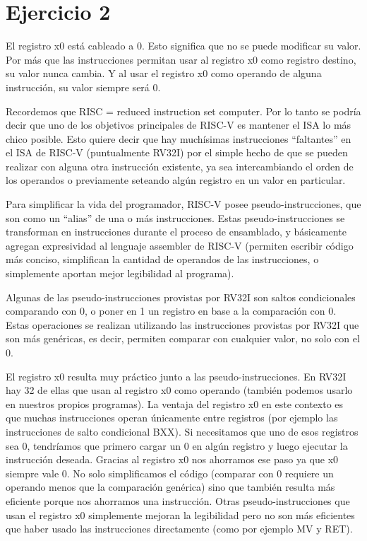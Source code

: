 \section{Ejercicio 2}

El registro x0 está cableado a 0. Esto significa que no se puede modificar su valor. Por más que las instrucciones permitan usar al registro x0 como registro destino, su valor nunca cambia. Y al usar el registro x0 como operando de alguna instrucción, su valor siempre será 0.

Recordemos que RISC = reduced instruction set computer. Por lo tanto se podría decir que uno de los objetivos principales de RISC-V es mantener el ISA lo más chico posible. Esto quiere decir que hay muchísimas instrucciones ``faltantes'' en el ISA de RISC-V (puntualmente RV32I) por el simple hecho de que se pueden realizar con alguna otra instrucción existente, ya sea intercambiando el orden de los operandos o previamente seteando algún registro en un valor en particular.

Para simplificar la vida del programador, RISC-V posee pseudo-instrucciones, que son como un ``alias'' de una o más instrucciones. Estas pseudo-instrucciones se transforman en instrucciones durante el proceso de ensamblado, y básicamente agregan expresividad al lenguaje assembler de RISC-V (permiten escribir código más conciso, simplifican la cantidad de operandos de las instrucciones, o simplemente aportan mejor legibilidad al programa).

Algunas de las pseudo-instrucciones provistas por RV32I son saltos condicionales comparando con 0, o poner en 1 un registro en base a la comparación con 0. Estas operaciones se realizan utilizando las instrucciones provistas por RV32I que son más genéricas, es decir, permiten comparar con cualquier valor, no solo con el 0.

El registro x0 resulta muy práctico junto a las pseudo-instrucciones. En RV32I hay 32 de ellas que usan al registro x0 como operando (también podemos usarlo en nuestros propios programas). La ventaja del registro x0 en este contexto es que muchas instrucciones operan únicamente entre registros (por ejemplo las instrucciones de salto condicional BXX). Si necesitamos que uno de esos registros sea 0, tendríamos que primero cargar un 0 en algún registro y luego ejecutar la instrucción deseada. Gracias al registro x0 nos ahorramos ese paso ya que x0 siempre vale 0. No solo simplificamos el código (comparar con 0 requiere un operando menos que la comparación genérica) sino que también resulta más eficiente porque nos ahorramos una instrucción. Otras pseudo-instrucciones que usan el registro x0 simplemente mejoran la legibilidad pero no son más eficientes que haber usado las instrucciones directamente (como por ejemplo MV y RET).

